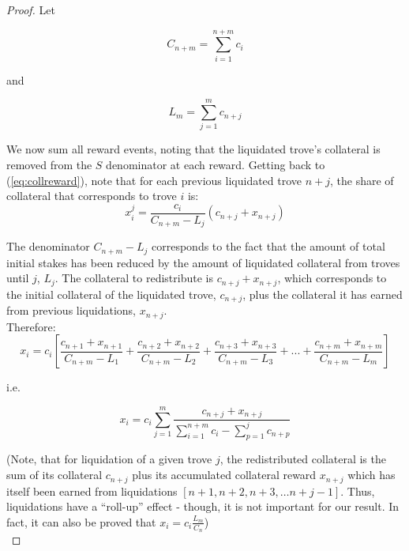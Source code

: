 \documentclass[reqno]{article}
\begin{document}
\begin{proof}
Let

\begin{equation} 
    C_{n+m}=\sum\limits^{n+m}_{i=1}c_i
\end{equation}

\bigskip
and

\begin{equation} 
    L_m=\sum\limits^m_{j=1}c_{n+j}
\end{equation}

\bigskip
We now sum all reward events, noting that the liquidated trove’s collateral is removed from the $S$ denominator at each reward. Getting back to (\ref{eq:collreward}), note that for each previous liquidated trove $n+j$, the share of collateral that corresponds to trove $i$ is: \\

\begin{equation} 
  x_i^j = \frac{c_i}{C_{n+m}-L_j}(c_{n+j}+x_{n+j})
\end{equation}

The denominator $C_{n+m}-L_j$ corresponds to the fact that the amount of total initial stakes has been reduced by the amount of liquidated collateral from  troves until $j$, $L_j$. The collateral to redistribute is $c_{n+j}+x_{n+j}$, which corresponds to the initial collateral of the liquidated trove, $c_{n+j}$, plus the collateral it has earned from previous liquidations, $x_{n+j}$. \\

Therefore:\\

\begin{equation} 
    x_i=c_i\left[\frac{c_{n+1}+x_{n+1}}{C_{n+m}-L_1}+\frac{c_{n+2}+x_{n+2}}{C_{n+m}-L_2}+\frac{c_{n+3}+x_{n+3}}{C_{n+m}-L_3}+...+\frac{c_{n+m}+x_{n+m}}{C_{n+m}-L_m}\right]
\end{equation}

\bigskip
i.e.

\begin{equation} 
    x_i=c_i\sum\limits^m_{j=1}\frac{c_{n+j}+x_{n+j}}{\sum\limits^{n+m}_{i=1}c_i-\sum\limits^j_{p=1}c_{n+p}}
\end{equation}

\bigskip
(Note, that for liquidation of a given trove $j$, the redistributed collateral is the sum of its collateral $c_{n+j}$ plus its accumulated collateral reward $x_{n+j}$ which has itself been earned from liquidations $[n+1, n+2, n+3, … n+j-1]$.  Thus, liquidations have a “roll-up” effect - though, it is not important for our result. In fact, it can also be proved that $x_i=c_i\frac{L_m}{C_n}$)\\


\end{proof}
\end{document}
